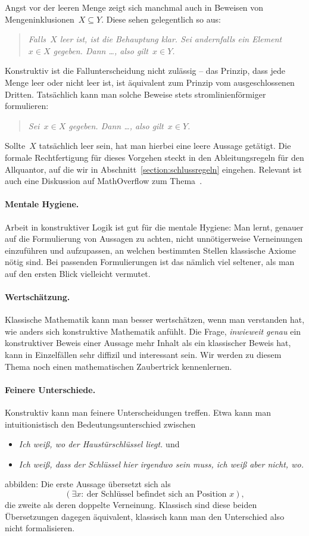 \documentclass[a4paper,ngerman,12pt]{scrartcl}
\theoremstyle{definition}
\theoremstyle{plain}
\theoremstyle{remark}
\renewcommand{\_}{\mathpunct{.}\,}
\newcommand{\?}{\,{:}\,}
\begin{document}
Angst vor der leeren Menge zeigt sich manchmal auch in Beweisen von
Mengeninklusionen~$X \subseteq Y$. Diese sehen gelegentlich so aus:
\begin{quote}\emph{Falls~$X$ leer ist, ist die Behauptung klar. Sei andernfalls
ein Element~$x \in X$ gegeben. Dann \ldots, also gilt~$x \in Y$.}\end{quote}
Konstruktiv ist die Fallunterscheidung nicht zulässig -- das Prinzip, dass jede
Menge leer oder nicht leer ist, ist äquivalent zum Prinzip vom ausgeschlossenen
Dritten. Tatsächlich kann man solche Beweise stets stromlinienförmiger
formulieren:
\begin{quote}\emph{Sei~$x \in X$ gegeben. Dann \ldots, also gilt~$x \in
Y$.}\end{quote}
Sollte~$X$ tatsächlich leer sein, hat man hierbei eine leere Aussage getätigt.
Die formale Rechtfertigung für dieses Vorgehen steckt in den Ableitungsregeln
für den Allquantor, auf die wir in Abschnitt~\ref{section:schlussregeln}
eingehen. Relevant ist auch eine Diskussion auf MathOverflow zum
Thema~\cite{mathoverflow:emptyset}.

\paragraph{Mentale Hygiene.} Arbeit in konstruktiver Logik ist gut für die
mentale Hygiene: Man lernt, genauer auf die Formulierung von Aussagen zu
achten, nicht unnötigerweise Verneinungen einzuführen und aufzupassen, an
welchen bestimmten Stellen klassische Axiome nötig sind. Bei passenden
Formulierungen ist das nämlich viel seltener, als man auf den ersten Blick
vielleicht vermutet.

\paragraph{Wertschätzung.} Klassische Mathematik kann man besser wertschätzen,
wenn man verstanden hat, wie anders sich konstruktive Mathematik anfühlt.
Die Frage, \emph{inwieweit genau} ein konstruktiver Beweis einer Aussage mehr
Inhalt als ein klassischer Beweis hat, kann in Einzelfällen sehr diffizil und
interessant sein. Wir werden zu diesem Thema noch einen mathematischen
Zaubertrick kennenlernen.

\paragraph{Feinere Unterschiede.} Konstruktiv kann man feinere Unterscheidungen
treffen. Etwa kann man intuitionistisch den Bedeutungsunterschied zwischen
\begin{itemize}
\item \emph{Ich weiß, wo der Haustürschlüssel liegt.} und
\item \emph{Ich weiß, dass der Schlüssel hier irgendwo sein muss, ich weiß aber
nicht, wo.}
\end{itemize}
abbilden: Die erste Aussage übersetzt sich als
\[ (\exists x{:}\ \text{der Schlüssel befindet sich an Position~$x$}), \]
die zweite als deren doppelte Verneinung. Klassisch sind diese beiden
Übersetzungen dagegen äquivalent, klassisch kann man den Unterschied also nicht
formalisieren.
\end{document}
